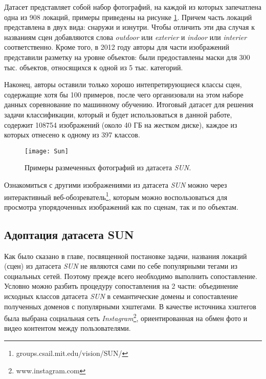 \indent
Датасет представляет собой набор фотографий, на каждой из которых запечатлена
одна из 908 локаций, примеры приведены на рисунке \ref{tikzpicture: sun}. Причем
часть локаций представлена в двух
вида: снаружи и изнутри. Чтобы отличить эти два случая к названиям сцен добавляются слова \textit{outdoor} или \textit{exterier} и \textit{indoor} или \textit{interier} соответственно.
Кроме того, в 2012 году авторы для части изображений представили разметку 
на уровне объектов: были предоставлены маски для 300 тыс. объектов, относящихся
к одной из 5 тыс. категорий.

\indent
Наконец, авторы оставили только хорошо интепретирующиеся классы сцен, 
содержащие хотя бы 100 примеров, после чего организовали на этом
наборе данных соревнование по машинному обучению. Итоговый датасет
для решения задачи классификации,
который и будет использоваться в данной работе,
содержит 108754 изображений (около 40 ГБ на жестком диске), каждое 
из которых отнесено к одному из 397 классов.

\begin{figure}[h]
    \begin{center}
   	    \texttt{[image: Sun]}
   	\end{center}
   	\caption{Примеры размеченных фотографий из датасета \textit{SUN}.}
   	\label{tikzpicture: sun}
\end{figure}

Ознакомиться с другими изображениями из датасета \textit{SUN} можно через 
интерактивный веб-обозреватель\footnote{groups.csail.mit.edu/vision/SUN/}, которым
можно воспользоваться для просмотра упорядоченных изображений как 
по сценам, так и по объектам.


\subsection{Адоптация датасета SUN}

\indent
\indent
Как было сказано в главе, посвященной постановке задачи,
 названия локаций (сцен) из датасета \textit{SUN} не 
являются сами по себе популярными тегами из социальных сетей. Поэтому 
прежде всего необходимо выполнить сопоставление. Условно можно
разбить процедуру сопоставления на 2 части: объединение исходных классов 
датасета \textit{SUN} в семантические домены и сопоставление полученных доменов
с популярными хэштегами. В качестве источника хэштегов была выбрана социальная
сеть \textit{Instagram}\footnote{www.instagram.com}, ориентированная на обмен фото
и видео контентом между пользователями.


